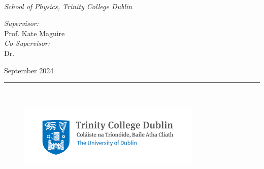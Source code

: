 \documentclass[a4paper,oneside,12pt]{Latex/Classes/PhDthesisPSnPDF}
\begin{document}
\vspace*{\fill}
\begin{flushright}
{ \\[1mm]
{\textnormal{\textit{School of Physics, Trinity College Dublin}}\\}

\vspace*{\fill}
\begin{flushright}
\textnormal{
\textit{Supervisor:} \\
Prof. Kate Maguire}\\[0.5mm]
\textnormal{
\textit{Co-Supervisor:} \\
Dr.}\\[0.5mm]
\end{flushright}
{September 2024}\\[5mm]
\rule{0.9\textwidth}{0.5mm}\\[4mm]
%
\begin{figure}[ht!]
\hspace{1mm}
\raggedleft
\includegraphics[height=30mm]{Other/tcd_logo.png}
\end{figure}

%
}
\end{flushright}


\frontmatter









\setcounter{secnumdepth}{3} %
\setcounter{tocdepth}{3}    %
\tableofcontents            %



\listoffigures	%
\listoftables  %
\end{document}
